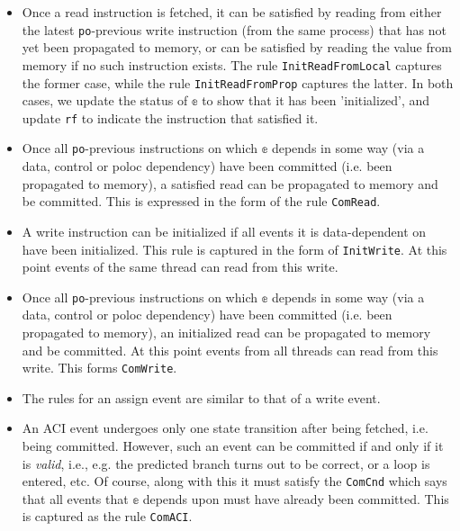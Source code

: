 \documentclass{article}
\begin{document}
\begin{itemize}
    \setlength\itemsep{0em}
    \item Once a read instruction is fetched, it can be satisfied by reading from either the latest \texttt{po}-previous write instruction (from the same process) that has not yet been propagated to memory, or can be satisfied by reading the value from memory if no such instruction exists. The rule \texttt{InitReadFromLocal} captures the former case, while the rule \texttt{InitReadFromProp} captures the latter. In both cases, we update the status of $\mathbb{e}$ to show that it has been 'initialized', and update \texttt{rf} to indicate the instruction that satisfied it.
    \item Once all \texttt{po}-previous instructions on which $\mathbb{e}$ depends in some way (via a data, control or poloc dependency) have been committed (i.e. been propagated to memory), a satisfied read can be propagated to memory and be committed. This is expressed in the form of the rule \texttt{ComRead}. 
    \item A write instruction can be initialized if all events it is data-dependent on have been initialized. This rule is captured in the form of \texttt{InitWrite}. At this point events of the same thread can read from this write.
    \item  Once all \texttt{po}-previous instructions on which $\mathbb{e}$ depends in some way (via a data, control or poloc dependency) have been committed (i.e. been propagated to memory), an initialized read can be propagated to memory and be committed. At this point events from all threads can read from this write. This forms \texttt{ComWrite}.
    \item The rules for an assign event are similar to that of a write event.
    \item An ACI event undergoes only one state transition after being fetched, i.e. being committed. However, such an event can be committed if and only if it is \textit{valid}, i.e., e.g. the predicted branch turns out to be correct, or a loop is entered, etc. Of course, along with this it must satisfy the \texttt{ComCnd} which says that all events that $\mathbb{e}$ depends upon must have already been committed. This is captured as the rule \texttt{ComACI}.
\end{itemize}
\vspace{-2em}
\end{document}
